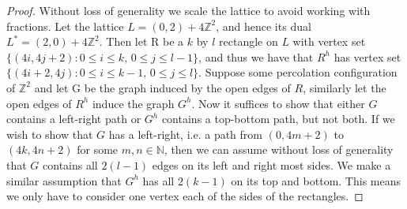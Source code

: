 \documentclass[a4paper,11pt]{article}
\theoremstyle{definition}
\newcommand{\ints}{\mathbb{Z}}
\begin{document}
\begin{proof}
	Without loss of generality we scale the lattice to avoid working with fractions. Let the lattice $L = (0,2) + 4\ints^2$, and hence its dual $L^* = (2,0)+4\ints^2$. Then let R be a $k$ by $l$ rectangle on $L$ with vertex set $\{(4i,4j+2): 0 \leq i \leq k \text{, } 0 \leq j \leq l-1 \}$, and thus we have that $R^h$ has vertex set $\{(4i+2,4j): 0 \leq i \leq k-1 \text{, } 0 \leq j \leq l \}$. Suppose some percolation configuration of $\ints^2$ and let G be the graph induced by the open edges of $R$, similarly let the open edges of $R^h$ induce the graph $G^h$. Now it suffices to show that either $G$ contains a left-right path or $G^h$ contains a top-bottom path, but not both. If we wish to show that $G$ has a left-right, i.e. a path from $(0,4m+2)$ to $(4k,4n+2)$ for some $m,n \in \mathbb{N}$, then we can assume without loss of generality that $G$ contains all $2(l-1)$ edges on its left and right most sides. We make a similar assumption that $G^h$ has all $2(k-1)$ on its top and bottom. This means we only have to consider one vertex each of the sides of the rectangles.


\end{proof}
\end{document}
